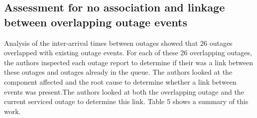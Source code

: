 \documentclass[5p]{elsarticle}
\begin{document}
\subsection{Assessment for no association and linkage between overlapping outage events}

Analysis of the inter-arrival times between outages showed that 26 outages overlapped with existing outage events. For each of these 26 overlapping outages, the authors inspected each outage report to determine if their was a link between these outages and outages already in the queue. The authors looked at the component affected and the root cause to determine whether a link between events was present.The authors looked at both the overlapping outage and the current serviced outage to determine this link. Table 5 shows a summary of this work.
\end{document}
